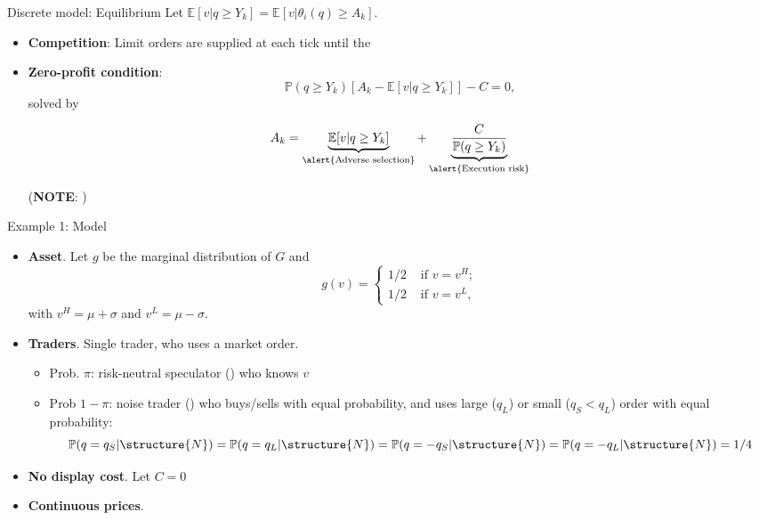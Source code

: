 \documentclass[english,10pt
,aspectratio=169
]{beamer}
\begin{document}
\begin{frame}{Discrete model: Equilibrium}
	Let $\mathbb{E}[v|q \geq Y_k]=\mathbb{E}[v|\theta_i(q) \geq A_k]$.
	\begin{itemize}
		\item \textbf{Competition}: Limit orders are supplied at each tick until the 
		\item \textbf{Zero-profit condition}:
		\[
		\mathbb{P}(q \geq Y_k)[A_k-\mathbb{E}[v|q \geq Y_k]] - C = 0,
		\]
		solved by
		\begin{block}{}
			\[
			A_k = \underbrace{\mathbb{E}[v| q \geq Y_k]}_{\text{\alert{Adverse selection}}} + \underbrace{\frac{C}{\mathbb{P}(q\geq Y_k)}}_{\text{\alert{Execution risk}}}
			\]
		\end{block}
		(\textbf{NOTE}: )
	\end{itemize}
\end{frame}


\begin{frame}{Example 1: Model} 
	\begin{itemize}
		\item \textbf{Asset}. Let $g$ be the marginal distribution of $G$ and
		\[
		g(v)=\left\{ \begin{aligned}
		1/2  & \text{ if } v=v^H; \\
		1/2 & \text{ if } v=v^L,
		\end{aligned}
		\right.
		\]
		with $v^{H}=\mu + \sigma $ and $v^{L}= \mu - \sigma $.
		\item \textbf{Traders}. Single trader, who uses a market order.
		\begin{itemize}
			\item Prob. $\pi$: risk-neutral speculator () who knows $v$
			\item Prob $1-\pi$: noise trader ()  who buys/sells with equal probability, and uses large ($q_L$) or small ($q_S<q_L$) order with equal probability:
			$$
			\mathbb{P}(q=q_S|\structure{N})= \mathbb{P}(q=q_L|\structure{N})=\mathbb{P}(q=-q_S|\structure{N})=\mathbb{P}(q=-q_L|\structure{N})=1/4
			$$
		\end{itemize}
		\item \textbf{No display cost}. Let $C=0$
		\item \textbf{Continuous prices}.
	\end{itemize}
\end{frame}
\end{document}
